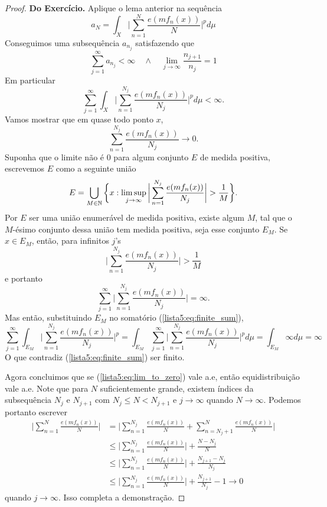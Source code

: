 \label{lista5:eq:limite_int}
\begin{proof}
    \textbf{Do Exercício.} Aplique o lema anterior na sequência
    $$a_N = \int_X \bigg|\sum_{n=1}^{N} \frac{e(mf_n(x))}{N} \bigg|^p d\mu$$
    Conseguimos uma subsequência $a_{n_j}$ satisfazendo que 
    $$\sum_{j=1}^{\infty} a_{n_j} < \infty \quad \land \quad \lim_{j \to \infty} \frac{n_{j+1}}{n_j} = 1$$
    Em particular
    \begin{equation}
        \label{lista5:eq:finite_sum}
        \sum_{j=1}^{\infty} \int_X \bigg|\sum_{n=1}^{N_j} \frac{e(mf_n(x))}{N_j} \bigg|^p d\mu < \infty.
    \end{equation}
    Vamos mostrar que em quase todo ponto $x$, 
    \begin{equation}
        \label{lista5:eq:lim_to_zero} 
        \sum_{n=1}^{N_j} \frac{e(mf_n(x))}{N_j} \to 0.
    \end{equation}
    Suponha que o limite não é $0$ para algum conjunto $E$ de medida positiva, escrevemos $E$ como a seguinte união
    $$E = \bigcup_{M \in \mathbb{N}} \bigg\{ x : \limsup_{j\rightarrow\infty} \bigg|\sum_{n=1}^{N_j} \frac{e(mf_n(x))}{N_j}\bigg| > \frac{1}{M} \bigg\}.$$
    Por $E$ ser uma união enumerável de medida positiva, existe algum $M$, tal que o $M$-ésimo conjunto dessa união tem medida
    positiva, seja esse conjunto $E_M$. Se $x \in E_M$, então, para infinitos $j$'s
    $$\bigg|\sum_{n=1}^{N_j} \frac{e(mf_n(x))}{N_j}\bigg| > \frac{1}{M}$$
    e portanto
    $$\sum_{j=1}^{\infty} \bigg|\sum_{n=1}^{N_j} \frac{e(mf_n(x))}{N_j}\bigg| = \infty.$$
    Mas então, substituindo $E_M$ no somatório (\ref{lista5:eq:finite_sum}),
    $$\sum_{j=1}^{\infty} \int_{E_M} \bigg|\sum_{n=1}^{N_j} \frac{e(mf_n(x))}{N_j} \bigg|^p = \int_{E_M} \sum_{j=1}^{\infty} \bigg|\sum_{n=1}^{N_j} \frac{e(mf_n(x))}{N_j} \bigg|^p d\mu = \int_{E_M} \infty d\mu = \infty $$
    O que contradiz (\ref{lista5:eq:finite_sum}) ser finito.

    Agora concluimos que se (\ref{lista5:eq:lim_to_zero}) vale a.e, então equidistribuição vale a.e.
    Note que para $N$ suficientemente grande, existem índices da subsequência $N_j$ e $N_{j+1}$
    com $N_j \leq N < N_{j+1}$ e $j \to \infty$ quando $N \to \infty$. Podemos portanto escrever
    \begin{align*}
        \bigg|\sum_{n=1}^{N} \frac{e(mf_n(x))}{N}\bigg| &= \bigg|\sum_{n=1}^{N_j} \frac{e(mf_n(x))}{N} + \sum_{n=N_j + 1}^{N} \frac{e(mf_n(x))}{N} \bigg|\\
        &\leq \bigg|\sum_{n=1}^{N_j} \frac{e(mf_n(x))}{N}\bigg| + \frac{N - N_j}{N}\\
        &\leq \bigg|\sum_{n=1}^{N_j} \frac{e(mf_n(x))}{N}\bigg| + \frac{N_{j+1} - N_j}{N_j}\\
        &\leq \bigg|\sum_{n=1}^{N_j} \frac{e(mf_n(x))}{N}\bigg| + \frac{N_{j+1}}{N_j} - 1 \to 0
    \end{align*}
    quando $j \to \infty$. Isso completa a demonstração.

\end{proof}

